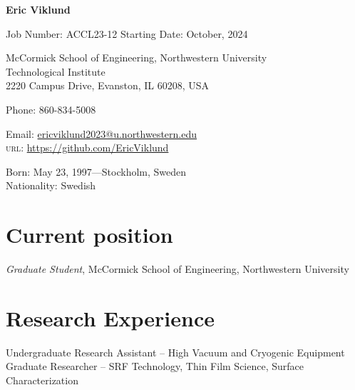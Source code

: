 \documentclass[11pt]{article} %
\begin{document}

{\LARGE\bfseries Eric Viklund} %
\bigskip\bigskip\medskip %

Job Number: ACCL23-12
Starting Date: October, 2024

McCormick School of Engineering,  Northwestern University\\ %
Technological Institute\\ 2220 Campus Drive, Evanston, IL 60208, USA
\medskip %

Phone: 860-834-5008 %
\medskip %

Email: \href{mailto:ericviklund2023@u.northwestern.edu}{ericviklund2023@u.northwestern.edu}\\ %
\textsc{url}: \href{https://github.com/EricViklund}{https://github.com/EricViklund}\\ %

\vspace{0.06\textheight} %


Born: May 23, 1997---Stockholm, Sweden\\ %
Nationality: Swedish %


\section*{Current position}

\emph{Graduate Student}, McCormick School of Engineering,  Northwestern University %


\section*{Research Experience}

Undergraduate Research Assistant -- High Vacuum and Cryogenic Equipment
Graduate Researcher -- SRF Technology, Thin Film Science, Surface Characterization 
\end{document}
